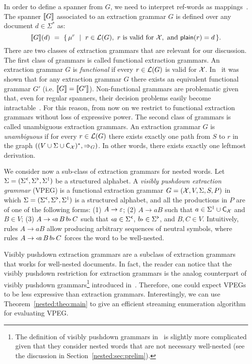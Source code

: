 In order to define a spanner from $G$, we need to interpret ref-words as mappings~\cite{Freydenberger19}. 
The spanner ${\llbracket{G}\rrbracket}$ associated to an extraction grammar $G$ is defined over any document $d \in \Sigma^*$ as:
$$
{\llbracket{G}\rrbracket}(d) \ = \ \{ \, \mu^r \ \mid \ r \in \mathcal{L}(G), \text{ $r$ is valid for $\mathcal{X}$}, \text{ and } \textsf{plain}(r) = d\, \}.
$$
There are two classes of extraction grammars that are relevant for our discussion.
The first class of grammars is called functional extraction grammars. 
An extraction grammar $G$ is \emph{functional} if every $r \in \mathcal{L}(G)$ is valid for $\mathcal{X}$.  In~\cite{liatpaper} it was shown that for any extraction grammar $G$ there exists an equivalent functional grammar $G'$ (i.e. ${\llbracket{G}\rrbracket} = {\llbracket{G'}\rrbracket}$). Non-functional grammars are problematic given that, even for regular spanners, their decision problems easily become intractable~\cite{MaturanaRV18,FreydenbergerKP18}. For this reason, from now on we restrict to functional extraction grammars without loss of expressive power. 
The second class of grammars is called unambiguous extraction grammars. An extraction grammar $G$ is \emph{unambiguous} if for every $r \in \mathcal{L}(G)$ there exists exactly one path from $S$ to $r$ in the graph $((V \cup \Sigma \cup \textsf{C}_{\mathcal{X}})^*, \Rightarrow_{G})$. In other words, there exists exactly one leftmost derivation.

We consider now a sub-class of extraction grammars for nested words. Let $\Sigma = (\Sigma^{\texttt{<}}, \Sigma^{\texttt{>}}, \Sigma^{\texttt{|}})$ be a structured alphabet. A \emph{visibly pushdown extraction grammar} (VPEG) is a functional extraction grammar $G = (\mathcal{X}, V, \Sigma, S, P)$ in which $\Sigma = (\Sigma^{\texttt{<}}, \Sigma^{\texttt{>}}, \Sigma^{\texttt{|}})$ is a structured alphabet, and all the productions in $P$ are of one of the following forms: (1) $A \rightarrow \varepsilon$; (2) $A \rightarrow a B$ such that $a \in \Sigma^{\texttt{|}} \cup \textsf{C}_{\mathcal{X}}$ and $B \in V$; (3) $A \rightarrow {\scriptsize\texttt{<}} a \, B \, b{\scriptsize\texttt{>}} \, C$ such that ${\scriptsize\texttt{<}} a \in \Sigma^{\texttt{<}}$, $b{\scriptsize\texttt{>}} \in \Sigma^{\texttt{>}}$, and $B, C \in V$. Intuitively, rules $A \rightarrow a B$ allow producing arbitrary sequences of neutral symbols, where rules $A \rightarrow {\scriptsize\texttt{<}} a \, B \, b{\scriptsize\texttt{>}} \, C$ forces the word to be well-nested. 

Visibly pushdown extraction grammars are a subclass of extraction grammars that works for well-nested documents. In fact, the reader can notice that the visibly pushdown restriction for extraction grammars is the analog counterpart of visibly pushdown grammars\footnote{The definition of visibly pushdown grammars in~\cite{AlurM04} is slightly more complicated given that they consider nested words that are not necessary well-nested (see the discussion in Section~\ref{nested:sec:prelim}).} introduced in~\cite{AlurM04}. Therefore, one could expect VPEGs to be less expressive than extraction grammars. 
Interestingly, we can use Theorem~\ref{nested:theo:main} to give an efficient streaming enumeration algorithm for evaluating VPEG. 


